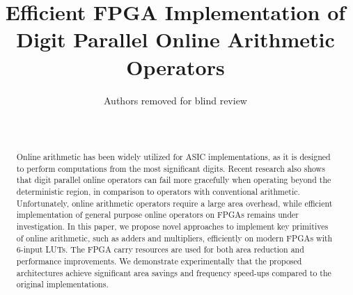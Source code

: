 \documentclass[conference]{IEEEtran}
\begin{document}
\title{Efficient FPGA Implementation of\\ Digit Parallel Online Arithmetic Operators}


\author{Authors removed for blind review\\ \\ \\}

\maketitle


\begin{abstract}
Online arithmetic has been widely utilized for ASIC implementations, as it is designed to perform computations from the most significant digits. Recent research also shows that digit parallel online operators can fail more gracefully when operating beyond the deterministic region, in comparison to operators with conventional arithmetic. Unfortunately, online arithmetic operators require a large area overhead, while efficient implementation of general purpose online operators on FPGAs remains under investigation. In this paper, we propose novel approaches to implement key primitives of online arithmetic, such as adders and multipliers, efficiently on modern FPGAs with 6-input LUTs. The FPGA carry resources are used for both area reduction and performance improvements. We demonstrate experimentally that the proposed architectures achieve significant area savings and frequency speed-ups compared to the original implementations.





\end{abstract}


%
\end{document}
